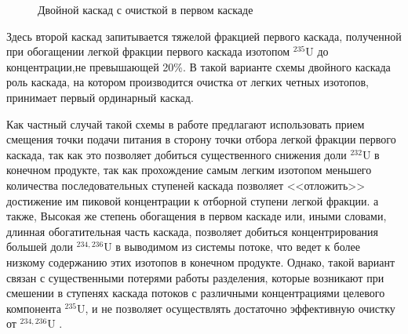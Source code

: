 \begin{figure}[ht]
  \caption{Двойной каскад с очисткой в первом каскаде}\label{fig:pure_double}
\end{figure}


Здесь второй каскад запитывается тяжелой фракцией первого каскада, полученной при обогащении легкой фракции первого каскада изотопом $^{235}$U до концентрации,не превышающей 20\%. В такой варианте схемы двойного каскада роль каскада, на котором производится очистка от легких четных изотопов, принимает первый ординарный каскад.

Как частный случай такой схемы в работе \cite{palkinReprocessedUraniumPurification2013} предлагают использовать прием смещения точки подачи питания в сторону точки отбора легкой фракции первого каскада, так как это позволяет добиться существенного снижения доли $^{232}$U в конечном продукте, так как прохождение самым легким изотопом меньшего количества последовательных ступеней каскада позволяет <<отложить>> достижение им пиковой концентрации к отборной ступени легкой фракции. а также, Высокая же степень обогащения в первом каскаде или, иными словами, длинная обогатительная часть каскада, позволяет добиться концентрирования большей доли $^{234,236}$U в выводимом из системы потоке, что ведет к более низкому содержанию этих изотопов в конечном продукте. Однако, такой вариант связан с существенными потерями работы разделения, которые возникают при смешении в ступенях каскада потоков с различными концентрациями целевого компонента $^{235}$U, и не позволяет осуществлять достаточно эффективную очистку от $^{234,236}$U \cite{palkinPurificationReprocessedUranium2016}.

